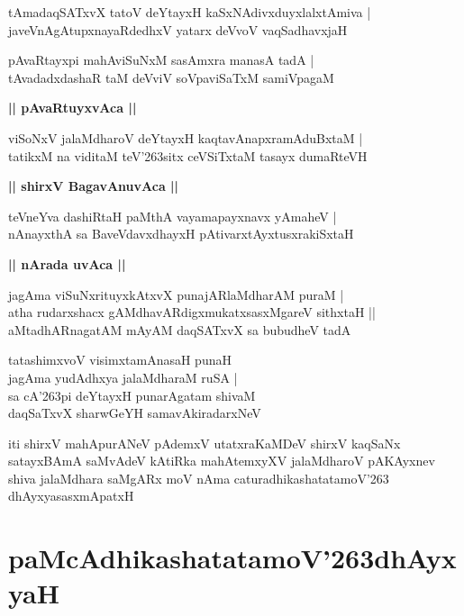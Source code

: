 \documentclass[twoside,12pt,openright]{book}
\def\S{\char'263}
\newcounter{shloka}[chapter]
\def\uvaca#1{\centerline{{\large\textbf{#1}}}}
\begin{document}
\begin{shloka}%
tAmadaqSATxvX tatoV deYtayxH kaSxNAdivxduyxlalxtAmiva |\\
javeVnAgAtupxnayaRdedhxV yatarx deVvoV vaqSadhavxjaH 
\end{shloka}

\begin{shloka}%
pAvaRtayxpi mahAviSuNxM sasAmxra manasA tadA |\\
tAvadadxdashaR taM deVviV soVpaviSaTxM samiVpagaM 
\end{shloka}

\uvaca{|| pAvaRtuyxvAca ||}

\begin{shloka}%
viSoNxV jalaMdharoV deYtayxH kaqtavAnapxramAduBxtaM |\\
tatikxM na viditaM teV\S sitx ceVSiTxtaM tasayx dumaRteVH
\end{shloka}

\uvaca{|| shirxV BagavAnuvAca ||}

\begin{shloka}%
teVneYva dashiRtaH paMthA vayamapayxnavx yAmaheV |\\
nAnayxthA sa BaveVdavxdhayxH pAtivarxtAyxtusxrakiSxtaH 
\end{shloka}

\uvaca{|| nArada uvAca ||}

\begin{shloka}%
jagAma viSuNxrituyxkAtxvX punajARlaMdharAM puraM |\\
atha rudarxshacx gAMdhavARdigxmukatxsasxMgareV sithxtaH ||\\
aMtadhARnagatAM mAyAM daqSATxvX sa bubudheV tadA 
\end{shloka}

\begin{shloka}%
tatashimxvoV visimxtamAnasaH punaH \\
jagAma yudAdhxya jalaMdharaM ruSA |\\
sa cA\S pi deYtayxH punarAgatam shivaM \\
daqSaTxvX sharwGeYH samavAkiradarxNeV 
\end{shloka}

\begin{center}
iti shirxV mahApurANeV pAdemxV utatxraKaMDeV shirxV kaqSaNx satayxBAmA saMvAdeV kAtiRka 
mahAtemxyXV jalaMdharoV pAKAyxnev shiva jalaMdhara saMgARx moV nAma caturadhikashatatamoV\S 
dhAyxyasasxmApatxH 
\end{center}

\chapter{paMcAdhikashatatamoV\S dhAyxyaH}
\end{document}
